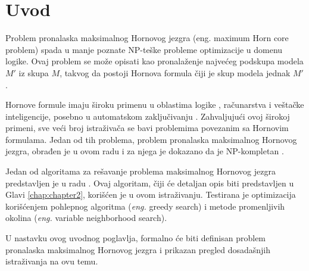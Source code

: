 \documentclass[12pt,oneside]{memoir}
\begin{document}
\frontmatter
\naslovna
\komisija
\apstrakt
\tableofcontents*

\mainmatter

\chapter{Uvod}
Problem pronalaska maksimalnog Hornovog jezgra (eng. maximum Horn core problem) spada u manje poznate NP-teške probleme optimizacije u domenu logike. Ovaj problem se može opisati kao pronalaženje najvećeg podskupa modela \(M'\) iz skupa \(M\), takvog da postoji Hornova formula čiji je skup modela jednak \(M'\) \cite{HCproblem}.

Hornove formule imaju široku primenu u oblastima logike \cite{doc43,doc2}, računarstva i veštačke inteligencije, posebno u automatskom zaključivanju \cite{doc41,doc42}. Zahvaljujući ovoj širokoj primeni, sve veći broj istraživača se bavi problemima povezanim sa Hornovim formulama. Jedan od tih problema, problem pronalaska maksimalnog Hornovog jezgra, obrađen je u ovom radu i za njega je dokazano da je NP-kompletan \cite{doc3}.



Jedan od algoritama za rešavanje problema maksimalnog Hornovog jezgra predstavljen je u radu \cite{doc1}. Ovaj algoritam, čiji će detaljan opis biti predstavljen u Glavi \ref{chap:chapter2}, korišćen je u ovom istraživanju. Testirana je optimizacija korišćenjem pohlepnog algoritma (\textit{eng.} greedy search) i metode promenljivih okolina (\textit{eng.} variable neighborhood search).

U nastavku ovog uvodnog poglavlja, formalno će biti definisan problem pronalaska maksimalnog Hornovog jezgra i prikazan pregled dosadašnjih istraživanja na ovu temu.
\end{document}
